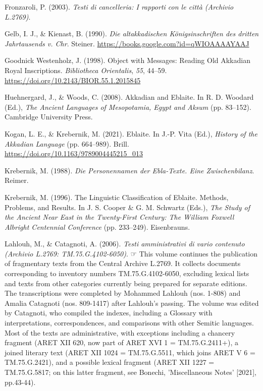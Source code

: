 \documentclass[
]{book}
\newlength{\cslhangindent}
\newlength{\cslentryspacingunit} %
\newenvironment{CSLReferences}[2] %
 {%
  \setlength{\parindent}{0pt}
  \ifodd #1
  \let\oldpar\par
  \def\par{\hangindent=\cslhangindent\oldpar}
  \fi
  \setlength{\parskip}{#2\cslentryspacingunit}
 }%
 {}
\newcommand{\CSLBlock}[1]{#1\hfill\break}
\begin{document}
\begin{CSLReferences}{1}{0}
\leavevmode{}%
Fronzaroli, P. (2003). \emph{Testi di cancelleria: I rapporti con le città (Archivio L.2769)}.

\leavevmode{}%
Gelb, I. J., \& Kienast, B. (1990). \emph{Die altakkadischen Königsinschriften des dritten Jahrtausends v. Chr}. Steiner. \url{https://books.google.com?id=qWIOAAAAYAAJ}

\leavevmode{}%
Goodnick Westenholz, J. (1998). Object with {Messages}: {Reading Old Akkadian Royal Inscriptions}. \emph{Bibliotheca Orientalis}, \emph{55}, 44--59. \url{https://doi.org/10.2143/BIOR.55.1.2015845}

\leavevmode{}%
Huehnergard, J., \& Woods, C. (2008). Akkadian and {Eblaite}. In R. D. Woodard (Ed.), \emph{The {Ancient Languages} of {Mesopotamia}, {Egypt} and {Aksum}} (pp. 83--152). Cambridge University Press.

\leavevmode{}%
Kogan, L. E., \& Krebernik, M. (2021). Eblaite. In J.-P. Vita (Ed.), \emph{History of the {Akkadian Language}} (pp. 664--989). Brill. \url{https://doi.org/10.1163/9789004445215_013}

\leavevmode{}%
Krebernik, M. (1988). \emph{Die Personennamen der Ebla-Texte. Eine Zwischenbilanz}. Reimer.

\leavevmode{}%
Krebernik, M. (1996). The {Linguistic Classification} of {Eblaite}. {Methods}, {Problems}, and {Results}. In J. S. Cooper \& G. M. Schwartz (Eds.), \emph{The {Study} of the {Ancient Near East} in the {Twenty-First Century}: {The William Foxwell Albright Centennial Conference}} (pp. 233--249). Eisenbrauns.

\leavevmode{}%
Lahlouh, M., \& Catagnoti, A. (2006). \emph{Testi amministrativi di vario contenuto (Archivio L.2769: TM.75.G.4102-6050)}.
\CSLBlock{\newline☞ This volume continues the publication of fragmentary texts from the Central Archive L.2769. It collects documents corresponding to inventory numbers TM.75.G.4102-6050, excluding lexical lists and texts from other categories currently being prepared for separate editions. The transcriptions were completed by Mohammed Lahlouh (nos. 1-808) and Amalia Catagnoti (nos. 809-1417) after Lahlouh's passing. The volume was edited by Catagnoti, who compiled the indexes, including a Glossary with interpretations, correspondences, and comparisons with other Semitic languages. Most of the texts are administrative, with exceptions including a chancery fragment (ARET XII 620, now part of ARET XVI 1 = TM.75.G.2411+), a joined literary text (ARET XII 1024 = TM.75.G.5511, which joins ARET V 6 = TM.75.G.2421), and a possible lexical fragment (ARET XII 1227 = TM.75.G.5817; on this latter fragment, see Bonechi, 'Miscellaneous Notes' {[}2021{]}, pp.43-44).}


\end{CSLReferences}
\end{document}
